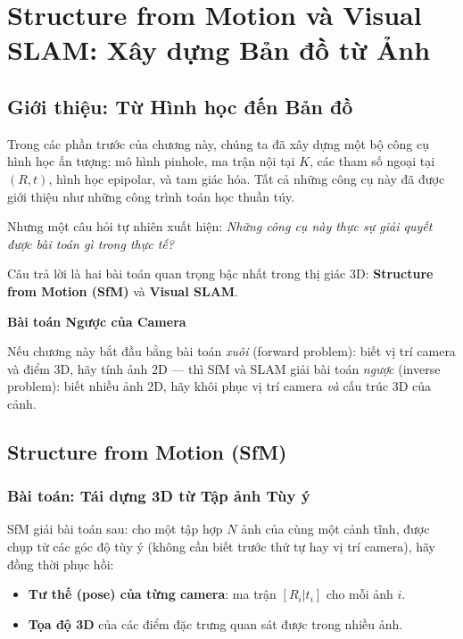 \section{Structure from Motion và Visual SLAM: Xây dựng Bản đồ từ Ảnh}
\label{sec:sfm_slam}

\subsection{Giới thiệu: Từ Hình học đến Bản đồ}
\label{subsec:sfm_intro}

Trong các phần trước của chương này, chúng ta đã xây dựng một bộ công cụ hình học ấn tượng: mô hình pinhole, ma trận nội tại $K$, các tham số ngoại tại $(R, t)$, hình học epipolar, và tam giác hóa. Tất cả những công cụ này đã được giới thiệu như những công trình toán học thuần túy.

Nhưng một câu hỏi tự nhiên xuất hiện: \textit{Những công cụ này thực sự giải quyết được bài toán gì trong thực tế?}

Câu trả lời là hai bài toán quan trọng bậc nhất trong thị giác 3D: \textbf{Structure from Motion (SfM)} và \textbf{Visual SLAM}.

\begin{mdframed}[style=infobox]
    \textbf{Bài toán Ngược của Camera}

    Nếu chương này bắt đầu bằng bài toán \textit{xuôi} (forward problem): biết vị trí camera và điểm 3D, hãy tính ảnh 2D — thì SfM và SLAM giải bài toán \textit{ngược} (inverse problem): biết nhiều ảnh 2D, hãy khôi phục vị trí camera \textit{và} cấu trúc 3D của cảnh.
\end{mdframed}

\subsection{Structure from Motion (SfM)}
\label{subsec:sfm}

\subsubsection{Bài toán: Tái dựng 3D từ Tập ảnh Tùy ý}
\label{subsubsec:sfm_problem}

SfM giải bài toán sau: cho một tập hợp $N$ ảnh của cùng một cảnh tĩnh, được chụp từ các góc độ tùy ý (không cần biết trước thứ tự hay vị trí camera), hãy đồng thời phục hồi:
\begin{itemize}
    \item \textbf{Tư thế (pose) của từng camera}: ma trận $[R_i | t_i]$ cho mỗi ảnh $i$.
    \item \textbf{Tọa độ 3D} của các điểm đặc trưng quan sát được trong nhiều ảnh.
\end{itemize}

